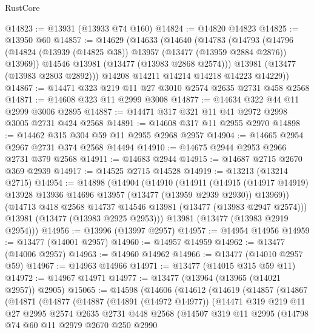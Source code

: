 \begin{lexlean}{RustCore}
\begin{coremodule}
@14823 := @13931 (@13933 @74 @160)
@14824 := @14820 @14823
@14825 := @13950 @60
@14857 := @14629
    (@14633
      (@14640
        (@14783
          (@14793
            (@14796 (@14824 (@13939 (@14825 @38)) @13957 (@13477 (@13959 @2884 @2876)) @13969))
            @14546
            @13981
            (@13477 (@13983 @2868 @2574)))
          @13981
          (@13477 (@13983 @2803 @2892)))
        @14208
        @14211
        @14214
        @14218
        @14223
        @14229))
@14867 := @14471 @323 @219 @11 @27 @3010 @2574 @2635 @2731 @458 @2568
@14871 := @14608 @323 @11 @2999 @3008
@14877 := @14634 @322 @44 @11 @2999 @3006 @2895
@14887 := @14471 @317 @321 @11 @41 @2972 @2998 @3005 @2731 @424 @2568
@14891 := @14608 @317 @11 @2955 @2970
@14898 := @14462 @315 @304 @59 @11 @2955 @2968 @2957
@14904 := @14665 @2954 @2967 @2731 @374 @2568 @14494
@14910 := @14675 @2944 @2953 @2966 @2731 @379 @2568
@14911 := @14683 @2944
@14915 := @14687 @2715 @2670 @369 @2939
@14917 := @14525 @2715 @14528
@14919 := @13213 (@13214 @2715)
@14954 := @14898
    (@14904
      (@14910
        (@14911
          (@14915 (@14917 @14919) @13928 @13936 @14696 @13957 (@13477 (@13959 @2939 @2930)) @13969))
        (@14713 @418 @2568 @14737 @14546 @13981 (@13477 (@13983 @2947 @2574)))
        @13981
        (@13477 (@13983 @2925 @2953)))
      @13981
      (@13477 (@13983 @2919 @2954)))
@14956 := @13996 (@13997 @2957)
@14957 := @14954 @14956
@14959 := @13477 (@14001 @2957)
@14960 := @14957 @14959
@14962 := @13477 (@14006 @2957)
@14963 := @14960 @14962
@14966 := @13477 (@14010 @2957 @59)
@14967 := @14963 @14966
@14971 := @13477 (@14015 @315 @59 @11)
@14972 := @14967 @14971
@14977 := @13477 (@13964 (@13965 (@14021 @2957)) @2905)
@15065 := @14598
    (@14606
      (@14612
        (@14619
          (@14857
            (@14867
              (@14871
                (@14877
                  (@14887
                    (@14891 (@14972 @14977))
                    (@14471
                      @319
                      @219
                      @11
                      @27
                      @2995
                      @2574
                      @2635
                      @2731
                      @448
                      @2568
                      (@14507
                        @319
                        @11
                        @2995
                        (@14798
                          @74
                          @60
                          @11
                          @2979
                          @2670
                          @250
                          @2990

\end{coremodule}
\end{lexlean}
